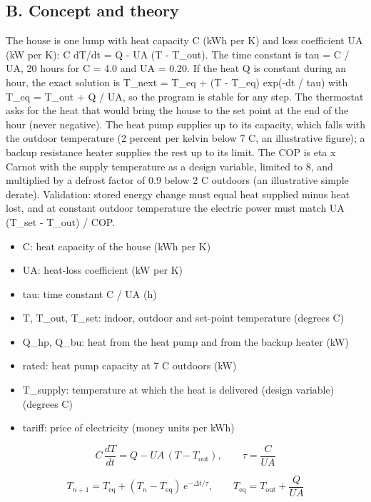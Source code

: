\documentclass[11pt,a4paper]{article}
\begin{document}
\subsection*{B. Concept and theory}
The house is one lump with heat capacity C (kWh per K) and loss coefficient UA (kW per K): C dT/dt = Q - UA (T - T\_out). The time constant is tau = C / UA, 20 hours for C = 4.0 and UA = 0.20. If the heat Q is constant during an hour, the exact solution is T\_next = T\_eq + (T - T\_eq) exp(-dt / tau) with T\_eq = T\_out + Q / UA, so the program is stable for any step. The thermostat asks for the heat that would bring the house to the set point at the end of the hour (never negative). The heat pump supplies up to its capacity, which falls with the outdoor temperature (2 percent per kelvin below 7 C, an illustrative figure); a backup resistance heater supplies the rest up to its limit. The COP is eta x Carnot with the supply temperature as a design variable, limited to 8, and multiplied by a defrost factor of 0.9 below 2 C outdoors (an illustrative simple derate). Validation: stored energy change must equal heat supplied minus heat lost, and at constant outdoor temperature the electric power must match UA (T\_set - T\_out) / COP.

\begin{itemize}[nosep]
\item C: heat capacity of the house (kWh per K)
\item UA: heat-loss coefficient (kW per K)
\item tau: time constant C / UA (h)
\item T, T\_out, T\_set: indoor, outdoor and set-point temperature (degrees C)
\item Q\_hp, Q\_bu: heat from the heat pump and from the backup heater (kW)
\item rated: heat pump capacity at 7 C outdoors (kW)
\item T\_supply: temperature at which the heat is delivered (design variable) (degrees C)
\item tariff: price of electricity (money units per kWh)
\end{itemize}

\begin{equation*}
C\,\frac{dT}{dt}=Q-UA\,(T-T_{\text{out}}),\qquad \tau=\frac{C}{UA}
\end{equation*}

\begin{equation*}
T_{n+1}=T_{\text{eq}}+(T_n-T_{\text{eq}})\,e^{-\Delta t/\tau},\qquad T_{\text{eq}}=T_{\text{out}}+\frac{Q}{UA}
\end{equation*}
\end{document}
